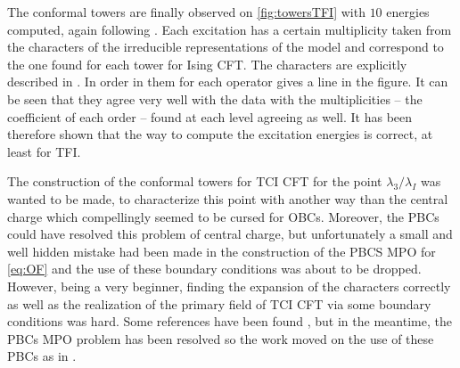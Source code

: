 	The conformal towers are finally observed on \autoref{fig:towersTFI} with $10$ energies computed, again following \cite{chepiga2017}. Each excitation has a certain multiplicity taken from the characters of the irreducible representations of the model \cite{cardy1986, cardy1989, francesco1997} and correspond to the one found for each tower for Ising CFT. The characters are explicitly described in \cite{chepiga2017}. In order in them for each operator gives a line in the figure. It can be seen that they agree very well with the data with the multiplicities -- the coefficient of each order -- found at each level agreeing as well. It has been therefore shown that the way to compute the excitation energies is correct, at least for TFI.

	The construction of the conformal towers for TCI CFT for the point $\lambda_3/\lambda_I$ was wanted to be made, to characterize this point with another way than the central charge  which compellingly seemed to be cursed for OBCs. Moreover, the PBCs could have resolved this problem of central charge, but unfortunately a small and well hidden mistake had been made in the construction of the PBCS MPO for \eqref{eq:OF} and the use of these boundary conditions was about to be dropped. However, being a very beginner, finding the expansion of the characters correctly as well as the realization of the primary field of TCI CFT via some boundary conditions was hard. Some references have been found \cite{affleck2000, belavin1984, cardy1986, cardy1989, friedan1985, friedan1984, lassig1991, qiu1986}, but in the meantime, the PBCs MPO problem has been resolved so the work moved on the use of these PBCs as in \cite{obrien2018}.

